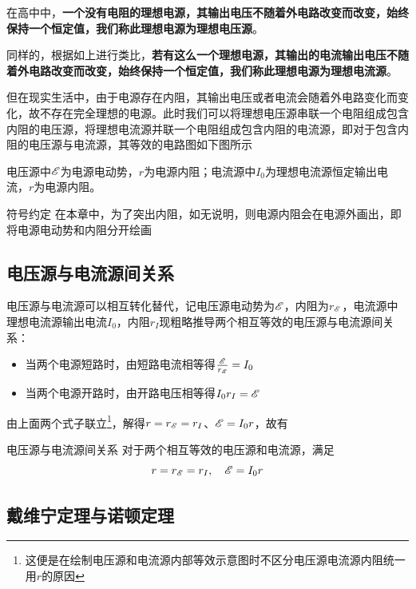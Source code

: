 在高中中，\textbf{一个没有电阻的理想电源，其输出电压不随着外电路改变而改变，始终保持一个恒定值，我们称此理想电源为理想电压源}。

同样的，根据如上进行类比，\textbf{若有这么一个理想电源，其输出的电流输出电压不随着外电路改变而改变，始终保持一个恒定值，我们称此理想电源为理想电流源}。

但在现实生活中，由于电源存在内阻，其输出电压或者电流会随着外电路变化而变化，故不存在完全理想的电源。此时我们可以将理想电压源串联一个电阻组成包含内阻的电压源，将理想电流源并联一个电阻组成包含内阻的电流源，即对于包含内阻的电压源与电流源，其等效的电路图如下图所示



电压源中$\mathscr{E}$为电源电动势，$r$为电源内阻；电流源中$I_0$为理想电流源恒定输出电流，$r$为电源内阻。

\begin{mk}{符号约定}{}
在本章中，为了突出内阻，如无说明，则电源内阻会在电源外画出，即将电源电动势和内阻分开绘画
\end{mk}

\subsection{电压源与电流源间关系}
\label{dyydlygx}

电压源与电流源可以相互转化替代，记电压源电动势为$\mathscr{E}$，内阻为$r_{\mathscr{E}}$，电流源中理想电流源输出电流$I_0$，内阻$r_I$现粗略推导两个相互等效的电压源与电流源间关系：

\begin{itemize}
\item 当两个电源短路时，由短路电流相等得$\frac{\mathscr{E}}{r_{\mathscr{E}}} = I_0$
\item 当两个电源开路时，由开路电压相等得$I_0 r_I = \mathscr{E}$
\end{itemize}

由上面两个式子联立\footnote{这便是在绘制电压源和电流源内部等效示意图时不区分电压源电流源内阻统一用$r$的原因}，解得$r = r_{\mathscr{E}} = r_{I}$、$\mathscr{E} = I_0 r $，故有

\begin{theo}{电压源与电流源间关系}{}
对于两个相互等效的电压源和电流源，满足
$$r = r_{\mathscr{E}} = r_{I} ,\quad \mathscr{E} = I_0 r$$
\end{theo}

\subsection{戴维宁定理与诺顿定理}

